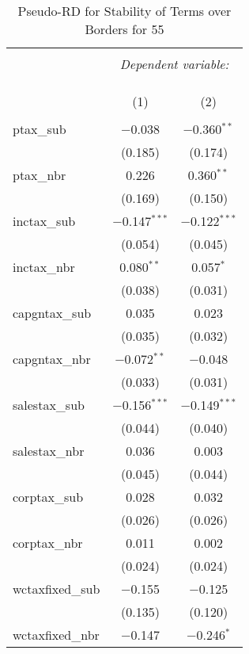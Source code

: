 
\begin{table}[!htbp] \centering 
  \caption{Pseudo-RD for Stability of Terms over Borders for  55} 
  \label{} 
\begin{tabular}{@{\extracolsep{5pt}}lcc} 
\\[-1.8ex]\hline 
\hline \\[-1.8ex] 
 & \multicolumn{2}{c}{\textit{Dependent variable:}} \\ 
\cline{2-3} 
\\[-1.8ex] & \multicolumn{2}{c}{ } \\ 
\\[-1.8ex] & (1) & (2)\\ 
\hline \\[-1.8ex] 
 ptax\_sub & $-$0.038 & $-$0.360$^{**}$ \\ 
  & (0.185) & (0.174) \\ 
  ptax\_nbr & 0.226 & 0.360$^{**}$ \\ 
  & (0.169) & (0.150) \\ 
  inctax\_sub & $-$0.147$^{***}$ & $-$0.122$^{***}$ \\ 
  & (0.054) & (0.045) \\ 
  inctax\_nbr & 0.080$^{**}$ & 0.057$^{*}$ \\ 
  & (0.038) & (0.031) \\ 
  capgntax\_sub & 0.035 & 0.023 \\ 
  & (0.035) & (0.032) \\ 
  capgntax\_nbr & $-$0.072$^{**}$ & $-$0.048 \\ 
  & (0.033) & (0.031) \\ 
  salestax\_sub & $-$0.156$^{***}$ & $-$0.149$^{***}$ \\ 
  & (0.044) & (0.040) \\ 
  salestax\_nbr & 0.036 & 0.003 \\ 
  & (0.045) & (0.044) \\ 
  corptax\_sub & 0.028 & 0.032 \\ 
  & (0.026) & (0.026) \\ 
  corptax\_nbr & 0.011 & 0.002 \\ 
  & (0.024) & (0.024) \\ 
  wctaxfixed\_sub & $-$0.155 & $-$0.125 \\ 
  & (0.135) & (0.120) \\ 
  wctaxfixed\_nbr & $-$0.147 & $-$0.246$^{*}$ \\ 

\end{tabular}
\end{table}
